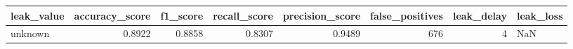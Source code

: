 \begin{tabular}{lrrrrrrl}
\toprule
leak\_value & accuracy\_score & f1\_score & recall\_score & precision\_score & false\_positives & leak\_delay & leak\_loss \\
\midrule
unknown & 0.8922 & 0.8858 & 0.8307 & 0.9489 & 676 & 4 & NaN \\
\bottomrule
\end{tabular}
